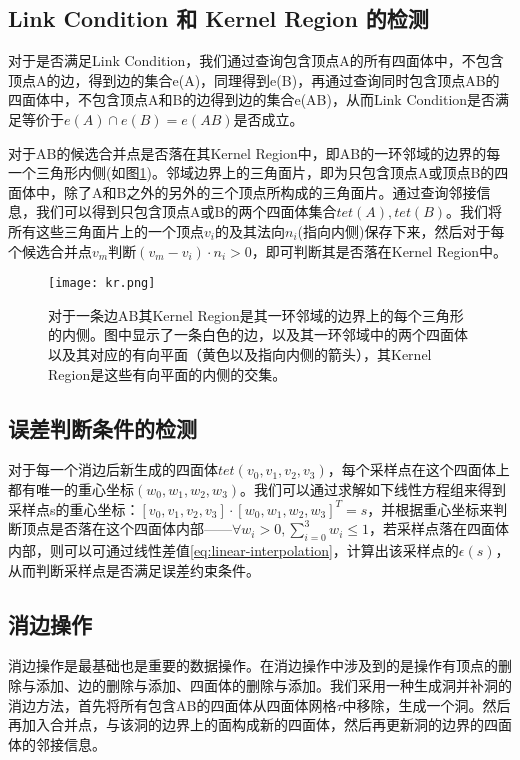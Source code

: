 \subsection{Link Condition 和 Kernel Region 的检测}
对于是否满足Link Condition，我们通过查询包含顶点A的所有四面体中，不包含顶点A的边，得到边的集合e(A)，同理得到e(B)，再通过查询同时包含顶点AB的四面体中，不包含顶点A和B的边得到边的集合e(AB)，从而Link Condition是否满足等价于$e(A) \cap e(B) = e(AB)$是否成立。 \par
对于AB的候选合并点是否落在其Kernel Region中，即AB的一环邻域的边界的每一个三角形内侧(如图\ref{fig:kr})。邻域边界上的三角面片，即为只包含顶点A或顶点B的四面体中，除了A和B之外的另外的三个顶点所构成的三角面片。通过查询邻接信息，我们可以得到只包含顶点A或B的两个四面体集合$tet(A),tet(B)$。我们将所有这些三角面片上的一个顶点$v_i$的及其法向$n_i$(指向内侧)保存下来，然后对于每个候选合并点$v_m$判断$(v_m − v_i) \cdot n_i > 0$，即可判断其是否落在Kernel Region中。
\begin{figure}[htbp]
    \centering
    \texttt{[image: kr.png]}
    \caption[3D Kernel Region]{对于一条边AB其Kernel Region是其一环邻域的边界上的每个三角形的内侧。图中显示了一条白色的边，以及其一环邻域中的两个四面体以及其对应的有向平面（黄色以及指向内侧的箭头），其Kernel Region是这些有向平面的内侧的交集。}
    \label{fig:kr}
\end{figure}

\subsection{误差判断条件的检测}
对于每一个消边后新生成的四面体$tet(v_0, v_1, v_2, v_3)$，每个采样点在这个四面体上都有唯一的重心坐标$(w_0, w_1, w_2, w_3)$。我们可以通过求解如下线性方程组来得到采样点s的重心坐标：$[v_0, v_1, v_2, v_3] \cdot [w_0, w_1, w_2, w_3]^T=s$，并根据重心坐标来判断顶点是否落在这个四面体内部——$\forall w_i>0, \sum_{i=0}^3 w_i \leq 1$，若采样点落在四面体内部，则可以可通过线性差值\eqref{eq:linear-interpolation}，计算出该采样点的$\epsilon(s)$，从而判断采样点是否满足误差约束条件。

\subsection{消边操作}
消边操作是最基础也是重要的数据操作。在消边操作中涉及到的是操作有顶点的删除与添加、边的删除与添加、四面体的删除与添加。我们采用一种生成洞并补洞的消边方法，首先将所有包含AB的四面体从四面体网格$\tau$中移除，生成一个洞。然后再加入合并点，与该洞的边界上的面构成新的四面体，然后再更新洞的边界的四面体的邻接信息。



